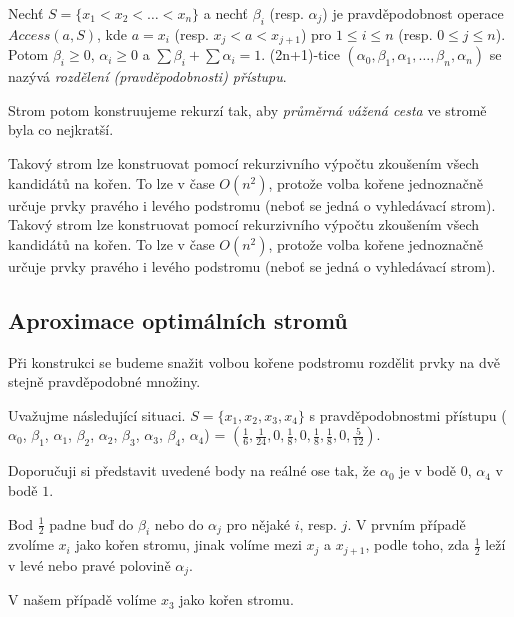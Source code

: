 \begin{defn} Nechť $S=\{x_1 < x_2 < \ldots < x_n\}$ 
a nechť $\beta_i$ (resp. $\alpha_j$) je prav\-dě\-po\-dob\-nost operace 
$Access(a,S)$, kde $a=x_i$ (resp. $x_j < a < x_{j+1}$) pro $1 \leq i \leq n$ 
(resp. $0 \leq j \leq n$).
Potom $\beta_i\geq0$, $\alpha_i\geq0$ a $\sum{\beta_i}+\sum{\alpha_i}=1$. 
(2n+1)-tice $(\alpha_0,\beta_1,\alpha_1,\ldots,\beta_n,\alpha_n)$ se nazývá 
\emph{rozdělení (pravděpodobnosti) přístupu}.
\end{defn}

Strom potom konstruujeme rekurzí tak, aby \emph{průměrná vážená cesta} 
ve stro\-mě byla co nejkratší.
\par

Takový strom lze konstruovat pomocí rekurzivního výpočtu zkoušením všech 
kandidátů na kořen. To lze v čase $O(n^2)$, protože volba kořene jednoznačně určuje 
prvky pravého i levého podstromu (neboť se jedná o vyhledávací strom).
Takový strom lze konstruovat pomocí rekurzivního výpočtu zkoušením všech 
kandidátů na kořen. To lze v čase $O(n^2)$, protože volba kořene jednoznačně určuje 
prvky pravého i levého podstromu (neboť se jedná o vyhledávací strom).
\subsection{Aproximace optimálních stromů}

\par
Při konstrukci se budeme snažit volbou kořene podstromu rozdělit prvky na dvě stejně pravděpodobné množiny.

Uvažujme následující situaci. $S=\{x_1, x_2, x_3, x_4\}$ s pravděpodobnostmi pří\-stu\-pu
($\alpha_0$, $\beta_1$, $\alpha_1$, $\beta_2$, $\alpha_2$, $\beta_3$, $\alpha_3$, $\beta_4$, $\alpha_4$) = 
$(\frac{1}{6},\frac{1}{24},0,\frac{ 1}{8},0,\frac{ 1}{8},\frac{ 1}{8}, 0,\frac{ 5}{12})$.

\par
Doporučuji si představit uvedené body na reálné ose tak, že $\alpha_0$ je v bodě $0$, $\alpha_4$ v bodě $1$.

\par
Bod $\frac{1}{2}$ padne buď do $\beta_i$ nebo do $\alpha_j$ pro nějaké $i$, resp. $j$. V prvním případě zvolíme $x_i$ jako 
kořen stromu, jinak volíme mezi $x_j$ a $x_{j+1}$, podle toho, zda $\frac{1}{2}$ leží v levé nebo pravé polovině $\alpha_j$. 

\par
V našem případě volíme $x_3$ jako kořen stromu.

